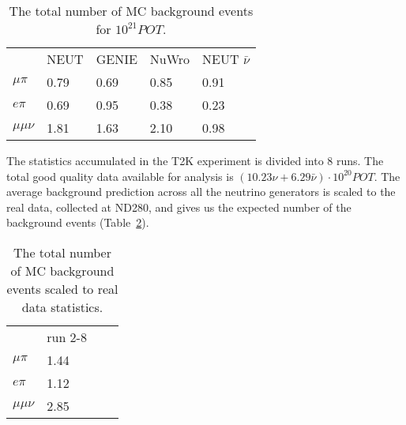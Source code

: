\documentclass[../main.tex]{subfiles}
\begin{document}
\begin{table}[!ht]
\begin{center}
\begin{tabular}{lllll}
                              & NEUT                    & GENIE                   & NuWro               & NEUT $\bar{\nu}$  \\
  $\mu\pi$ \hspace{0.5cm}     & 0.79   \hspace{1cm}     & 0.69  \hspace{1cm}      & 0.85  \hspace{1cm}  & 0.91              \\
  $e\pi$                      & 0.69                    & 0.95                    & 0.38                & 0.23              \\
  $\mu\mu\nu$                 & 1.81                    & 1.63                    & 2.10                & 0.98              \\
\end{tabular}
\caption{The total number of MC background events for $10^{21} POT$.}
\label{tbl:HNL:bg}
\end{center}
\end{table}

The statistics accumulated in the T2K experiment is divided into 8 runs. The total good quality data available for analysis is $\left(10.23\nu+6.29\bar{\nu}\right)\cdot 10^{20}POT$. The average background prediction across all the neutrino generators is scaled to the real data, collected at ND280, and gives us the expected number of the background events (Table~\ref{tbl:HNL:bgScale}).

\begin{table}[!ht]
\begin{center}
\begin{tabular}{llll}
                            & run 2-8               \\
  $\mu\pi$ \hspace{0.5cm}   & 1.44  \hspace{2cm}    \\
  $e\pi$                    & 1.12                  \\
  $\mu\mu\nu$               & 2.85                  \\
\end{tabular}
\caption{The total number of MC background events scaled to real data statistics.}
\label{tbl:HNL:bgScale}
\end{center}
\end{table}
\end{document}

